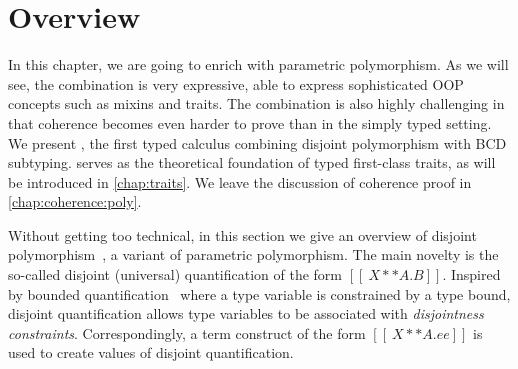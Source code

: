 
\section{Overview}

In this chapter, we are going to enrich \namee with parametric polymorphism. As we will see,
the combination is very expressive, able to express sophisticated OOP
concepts such as mixins and traits. The combination is also highly challenging
in that coherence becomes even harder to prove than in the simply typed setting.
We present \fnamee, the first typed calculus combining disjoint
polymorphism with BCD subtyping. \fnamee serves as the theoretical
foundation of typed first-class traits, as will be introduced in \cref{chap:traits}.
We leave the discussion of coherence proof in \cref{chap:coherence:poly}.

Without getting too technical, in this section we give an overview of
disjoint polymorphism~\citep{alpuimdisjoint}, a variant of parametric polymorphism. The main novelty
is the so-called disjoint (universal) quantification of the form
$[[ \ X ** A . B ]]$. Inspired by bounded quantification~\citep{cardelli1994extension} where a
type variable is constrained by a type bound, disjoint quantification allows
type variables to be associated with \textit{disjointness constraints}. Correspondingly, a
term construct of the form $[[ \ X ** A. ee ]]$ is used to create values of
disjoint quantification.


